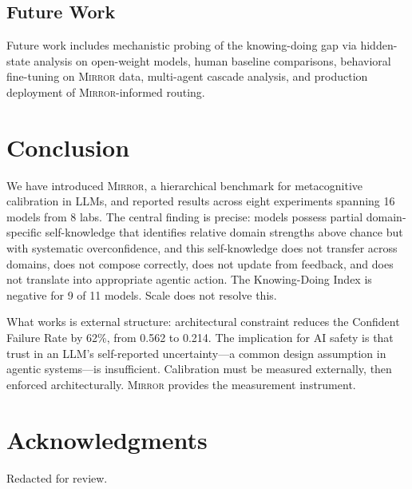 \documentclass[10pt]{article}
\newcommand{\mirror}{\textsc{Mirror}}
\begin{document}
\subsection{Future Work}

Future work includes mechanistic probing of the knowing-doing gap via hidden-state analysis on open-weight models, human baseline comparisons, behavioral fine-tuning on \mirror{} data, multi-agent cascade analysis, and production deployment of \mirror{}-informed routing.

\vspace{-1mm}
\section{Conclusion}
\label{sec:conclusion}

We have introduced \mirror{}, a hierarchical benchmark for metacognitive
calibration in LLMs, and reported results across eight experiments spanning 16
models from 8 labs. The central finding is precise: models possess partial domain-specific
self-knowledge that identifies relative domain strengths above chance but with
systematic overconfidence, and this self-knowledge
does not transfer across domains, does not compose correctly, does not update from
feedback, and does not translate into appropriate agentic action. The Knowing-Doing
Index is negative for 9 of 11 models. Scale does not resolve this.

What works is external structure: architectural constraint reduces the Confident
Failure Rate by 62\%, from 0.562 to 0.214. The implication for AI safety is that
trust in an LLM's self-reported uncertainty---a common design assumption in agentic
systems---is insufficient. Calibration must be measured externally, then enforced
architecturally. \mirror{} provides the measurement instrument.

\section*{Acknowledgments}

Redacted for review.

\FloatBarrier


\end{document}
